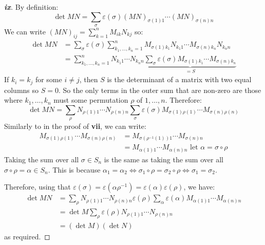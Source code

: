 \documentclass[../main.tex]{subfiles}
\begin{document}
\begin{proof}[\textbf{ix}]
  By definition:
  \[
    \det MN = \sum_{\sigma} \varepsilon(\sigma) (MN)_{\sigma(1) 1} \cdots (MN)_{\sigma(n) n}
  \]
  We can write $(MN)_{i j} = \sum_{k = 1}^{n} M_{i k}N_{k j}$ so:
  \begin{align*}
    \det MN &= \sum_{\sigma} \varepsilon(\sigma) \sum_{k_1, \ldots, k_n = 1}^n M_{\sigma(1) k_1}N_{k_1 1} \cdots M_{\sigma(n) k_n}N_{k_n n} \\
            &= \sum_{k_1, \ldots, k_n = 1}^{n} N_{k_1 1} \cdots N_{k_n n} \underbrace{\sum_{\sigma} \varepsilon(\sigma)M_{\sigma(1) k_1} \cdots M_{\sigma(n) k_n}}_{=S}
  \end{align*}
  If $k_i = k_j$ for some $i \neq j$, then $S$ is the determinant of a matrix with two equal columns so $S = 0$.
  So the only terms in the outer sum that are non-zero are those where $k_1, \ldots, k_n$ must some permutation $\rho$ of $1, \ldots, n$.
  Therefore:
  \[
    \det MN = \sum_{\rho} N_{\rho(1) 1} \cdots N_{\rho(n) n} \sum_{\sigma} \varepsilon(\sigma) M_{\sigma(1) \rho(1)} \cdots M_{\sigma(n) \rho(n)}
  \]
  Similarly to in the proof of \textbf{vii}, we can write:
  \begin{align*}
    M_{\sigma(1) \rho(1)} \cdots M_{\sigma(n) \rho(n)} &= M_{\sigma(\rho^{-1}(1)) 1} \cdots M_{\sigma(n) n} \\
                                                       &= M_{\alpha(1) 1} \cdots M_{\alpha(n) n} \text{ let $\alpha = \sigma \circ \rho$}
  \end{align*}
  Taking the sum over all $\sigma \in S_n$  is the same as taking the sum over all $\sigma \circ \rho = \alpha \in S_n$.
  This is because $\alpha_1 = \alpha_2 \iff \sigma_1 \circ \rho = \sigma_2 \circ \rho \iff \sigma_1 = \sigma_2$.

  Therefore, using that $\varepsilon(\sigma) = \varepsilon(\alpha \rho^{-1}) = \varepsilon(\alpha)\varepsilon(\rho)$, we have:
  \begin{align*}
    \det MN &= \sum_{\rho} N_{\rho(1) 1} \cdots N_{\rho(n) n} \varepsilon(\rho) \sum_{\alpha} \varepsilon(\alpha) M_{\alpha(1) 1} \cdots M_{\alpha(n) n} \\
            &= \det M \sum_{\rho} \varepsilon(\rho) N_{\rho(1) 1} \cdots N_{\rho(n) n} \\
            &= (\det M)(\det N)
  \end{align*}
  as required.
\end{proof}
\label{orthoDeterminant}
\end{document}
